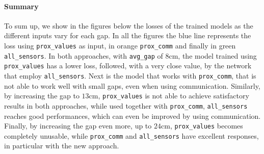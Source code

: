 \paragraph*{Summary}

To sum up, we show in the figures below the losses of the trained models as the 
different inputs vary for each gap. In all the figures the blue line represents the 
loss using \texttt{prox\_values} as input, in orange \texttt{prox\_comm} and 
finally in green \texttt{all\_sensors}.
In both approaches, with \texttt{avg\_gap} of $8$\gls{cm}, the model trained 
using \texttt{prox\_values} has a lower loss, followed, with a very close value, by 
the network that employ \texttt{all\_sensors}.
Next is the model that works with \texttt{prox\_comm}, that is not able to work 
well with small gaps, even when using communication. 
Similarly, by increasing the gap to $13$\gls{cm}, \texttt{prox\_values} is not able 
to achieve satisfactory results in both approaches, while used together with 
\texttt{prox\_comm}, \texttt{all\_sensors} reaches good performances, which can 
even be improved by using communication.
Finally, by increasing the gap even more, up to $24$\gls{cm}, 
\texttt{prox\_values} becomes completely unusable, while \texttt{prox\_comm} 
and \texttt{all\_sensors} have excellent responses, in particular with the new 
approach.
